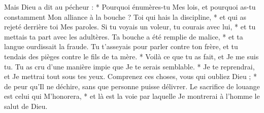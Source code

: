  Mais Dieu a dit au pécheur : * Pourquoi énumères-tu Mes lois, et pourquoi as-tu constamment Mon alliance à la bouche ?
\versseparator
 Toi qui hais la discipline, * et qui as rejeté derrière toi Mes paroles.
\versseparator
 Si tu voyais un voleur, tu courais avec lui, * et tu mettais ta part avec les adultères.
\versseparator
 Ta bouche a été remplie de malice, * et ta langue ourdissait la fraude.
\versseparator
 Tu t'asseyais pour parler contre ton frère, et tu tendais des pièges contre le fils de ta mère. * Voilà ce que tu as fait, et Je me suis tu.
\versseparator
 Tu as cru d'une manière impie que Je te serais semblable. * Je te reprendrai, et Je mettrai tout sous tes yeux.
\versseparator
 Comprenez ces choses, vous qui oubliez Dieu ; * de peur qu'Il ne déchire, sans que personne puisse délivrer.
\versseparator
 Le sacrifice de louange est celui qui M'honorera, * et là est la voie par laquelle Je montrerai à l'homme le salut de Dieu.